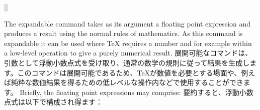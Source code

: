 \documentclass{ltxguide}
\newcommand\jpnewline{\vspace{3pt}\newline}
\begin{document}
\begin{decl}
  |\fpeval| 
\end{decl}

The expandable command  takes as its argument a floating
point expression and produces a result using the normal rules of
mathematics. As this command is expandable it can be used where \TeX{}
requires a number and for example within a low-level  operation
to give a purely numerical result.
\jpnewline
展開可能なコマンドは、引数として浮動小数点式を受け取り、通常の数学の規則に従って結果を生成します。このコマンドは展開可能であるため、\TeX{}が数値を必要とする場面や、例えば純粋な数値結果を得るための低レベルな操作内などで使用することができます。
\jpnewline
Briefly, the floating point expressions may comprise:
\jpnewline
要約すると、浮動小数点式は以下で構成され得ます：
\end{document}
